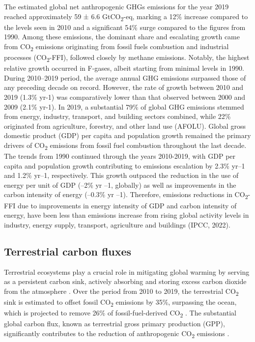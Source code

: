 The estimated global net anthropogenic GHGs emissions for the year 2019 reached approximately 59 ± 6.6 GtCO\textsubscript{2}-eq, marking a 12\% increase compared to the levels seen in 2010 and a significant 54\% surge compared to the figures from 1990. Among these emissions, the dominant share and escalating growth came from CO\textsubscript{2} emissions originating from fossil fuels combustion and industrial processes (CO\textsubscript{2}-FFI), followed closely by methane emissions. Notably, the highest relative growth occurred in F-gases, albeit starting from minimal levels in 1990. During 2010–2019 period, the average annual GHG emissions surpassed those of any preceding decade on record. However, the rate of growth between 2010 and 2019 (1.3\% yr-1) was comparatively lower than that observed between 2000 and 2009 (2.1\% yr-1). In 2019, a substantial 79\% of global GHG emissions stemmed from energy, industry, transport, and building sectors combined, while 22\% originated from agriculture, forestry, and other land use (AFOLU). Global gross domestic product (GDP) per capita and population growth remained the primary drivers of CO\textsubscript{2} emissions from fossil fuel combustion throughout the last decade. The trends from 1990 continued through the years 2010-2019, with GDP per capita and population growth contributing to emissions escalation by 2.3\% yr–1 and 1.2\% yr–1, respectively. This growth outpaced the reduction in the use of energy per unit of GDP (–2\% yr –1, globally) as well as improvements in the carbon intensity of energy (–0.3\% yr –1). Therefore, emissions reductions in CO\textsubscript{2}-FFI due to improvements in energy intensity of GDP and carbon intensity of energy, have been less than emissions increase from rising global activity levels in industry, energy supply, transport, agriculture and buildings (IPCC, 2022). \par

\subsection{Terrestrial carbon fluxes}

Terrestrial ecosystems play a crucial role in mitigating global warming by serving as a persistent carbon sink, actively absorbing and storing excess carbon dioxide from the atmosphere \citep{pan2011large}. Over the period from 2010 to 2019, the terrestrial CO\textsubscript{2} sink is estimated to offset fossil CO\textsubscript{2} emissions by 35\%, surpassing the ocean, which is projected to remove 26\% of fossil-fuel-derived CO\textsubscript{2} \citep{friedlingstein2020global, wang2022disentangling}. The substantial global carbon flux, known as terrestrial gross primary production (GPP), significantly contributes to the reduction of anthropogenic CO\textsubscript{2} emissions \citep{beer2010terrestrial}. \par

